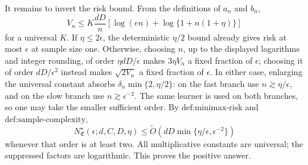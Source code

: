 It remains to invert the risk bound. From the definitions of \(a_n\) and \(b_n\),
\[
V_n\le K\frac{dD}{n}\left[\log(en)+\log\{1+n(1+\eta)\}\right]
\]
for a universal \(K\). If \(\eta\le2\epsilon\), the deterministic \(\eta/2\) bound already gives risk at most \(\epsilon\) at sample size one. Otherwise, choosing \(n\), up to the displayed logarithms and integer rounding, of order \(\eta dD/\epsilon\) makes \(3\eta V_n\) a fixed fraction of \(\epsilon\); choosing it of order \(dD/\epsilon^2\) instead makes \(\sqrt{2V_n}\) a fixed fraction of \(\epsilon\). In either case, enlarging the universal constant absorbs \(\delta_n\min\{2,\eta/2\}\): on the fast branch use \(n\gtrsim\eta/\epsilon\), and on the slow branch use \(n\gtrsim\epsilon^{-2}\). The same learner is used on both branches, so one may take the smaller sufficient order. By \(\text{def:minimax-risk}\) and \(\text{def:sample-complexity}\),
\[
N^\star_{\mathfrak E}(\epsilon;d,C,D,\eta)
\le\widetilde O\left(dD\min\{\eta/\epsilon,\epsilon^{-2}\}\right)
\]
whenever that order is at least two. All multiplicative constants are universal; the suppressed factors are logarithmic. This proves the positive answer.